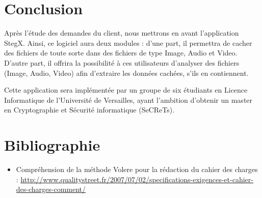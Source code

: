 \documentclass[11pt]{article}
\begin{document}
\section{Conclusion}
Après l'étude des demandes du client, nous mettrons en avant l'application StegX. Ainsi, ce logiciel aura deux modules : d'une part, il permettra de cacher des fichiers de toute sorte dans 
des fichiers de type Image, Audio et Video. D'autre part, il offrira la possibilité à ces utilisateurs d'analyser des fichiers (Image, Audio, Video) afin d'extraire les données cachées, s'ils en 
contiennent. 

Cette application sera implémentée par un groupe de six étudiants en Licence Informatique de l'Université de Versailles, ayant l'ambition d'obtenir un master en Cryptographie et Sécurité informatique (SeCReTs). 

\newpage
\section{Bibliographie}
\begin {itemize}
\item Compréhension de la méthode Volere pour la rédaction du cahier des charges : \url{http://www.qualitystreet.fr/2007/07/02/specifications-exigences-et-cahier-des-charges-comment/}
\end{itemize}
\end{document}
